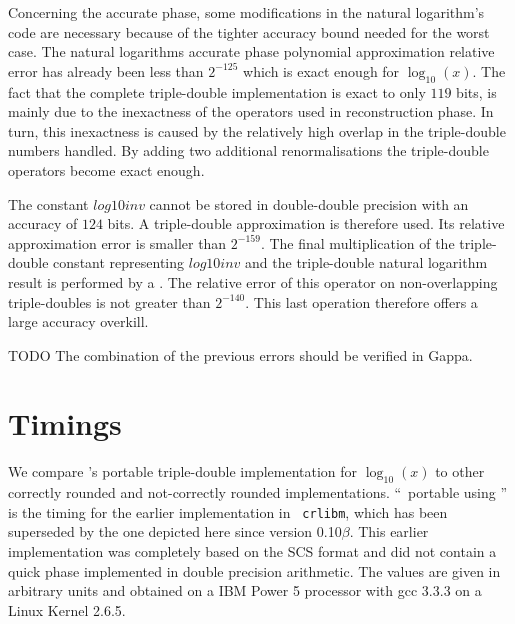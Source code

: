 Concerning the accurate phase, some modifications in the natural
logarithm's code are necessary because of the tighter accuracy bound
needed for the worst case. The natural logarithms accurate phase
polynomial approximation relative error has already been less than
$2^{-125}$ which is exact enough for $\log_{10}\left( x
\right)$. The fact that the complete triple-double implementation is
exact to only $119$ bits, is mainly due to the inexactness of the
operators used in reconstruction phase. In turn, this inexactness is
caused by the relatively high overlap in the triple-double numbers
handled. By adding two additional renormalisations the triple-double
operators become exact enough.

The constant $\mathit{log10inv}$ cannot be stored in double-double
precision with an accuracy of $124$ bits. A triple-double
approximation is therefore used. Its relative approximation error is
smaller than $2^{-159}$. The final multiplication of the triple-double
constant representing $\mathit{log10inv}$ and the triple-double
natural logarithm result is performed by a \MulTT. The relative error
of this operator on non-overlapping triple-doubles is not greater than
$2^{-140}$. This last operation therefore offers a large accuracy
overkill.

TODO The combination of the previous errors should be verified in Gappa.


\section{Timings}\label{subsec:timingslog10}

We compare \crlibm's portable triple-double implementation
for $\log_{10}\left( x \right)$ to other correctly rounded and
not-correctly rounded implementations.  ``\crlibm\ portable using
\scslib'' is the timing for the earlier implementation in {\tt
  crlibm}, which has been superseded by the one depicted here since
version 0.10$\beta$. This earlier implementation was completely based
on the SCS format and did not contain a quick phase implemented in
double precision arithmetic. The values are given in arbitrary units
and obtained on a IBM Power 5 processor with gcc 3.3.3 on a Linux
Kernel 2.6.5.

